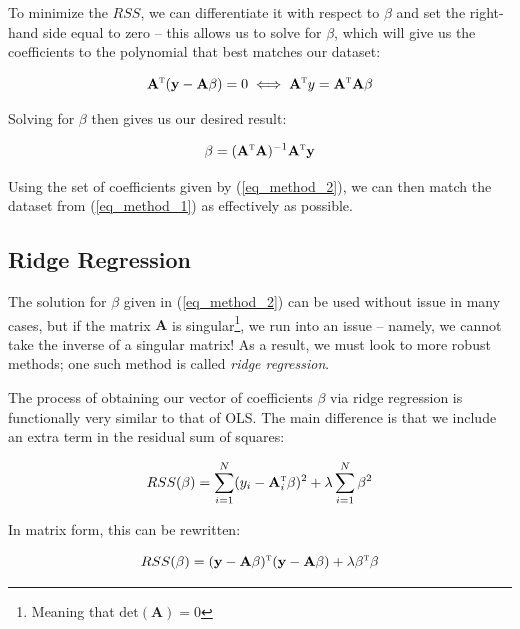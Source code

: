 \documentclass[a4paper,10pt,english]{article}
\begin{document}
	To minimize the $RSS$, we can differentiate it with respect to $\beta$ and set the right-hand side equal to zero – this allows us to solve for $\beta$, which will give us the coefficients to the polynomial that best matches our dataset:
	
	\begin{equation*}
	\mathbf{A}^\textsc{t} (\mathbf{y} - \mathbf{A} \beta) = 0 \iff \mathbf{A}^\textsc{t} y = \mathbf{A}^\textsc{t} \mathbf{A} \beta
	\end{equation*}
	
	Solving for $\beta$ then gives us our desired result:
	
	\begin{equation}
	\label{eq_method_2}
	\beta = (\mathbf{A}^\textsc{t} \mathbf{A} ) ^{-1} \mathbf{A}^\textsc{t} \mathbf{y}
	\end{equation}
	
	Using the set of coefficients given by (\ref{eq_method_2}), we can then match the dataset from (\ref{eq_method_1}) as effectively as possible.
	
	\subsection*{Ridge Regression}
	
	The solution for $\beta$ given in (\ref{eq_method_2}) can be used without issue in many cases, but if the matrix $\mathbf{A}$ is singular\footnote{Meaning that $\text{det}(\mathbf{A}) = 0$}, we run into an issue – namely, we cannot take the inverse of a singular matrix!  As a result, we must look to more robust methods; one such method is called \textit{ridge regression}.  
	
	The process of obtaining our vector of coefficients $\beta$ via ridge regression is functionally very similar to that of OLS.  The main difference is that we include an extra term in the residual sum of squares:

	\begin{equation*}
	RSS(\beta) = \sum_{i=1}^N (y_i - \mathbf{A}_i^\textsc{t} \beta)^2 + \lambda \sum_{i=1}^N \beta^2
	\end{equation*}
	
	In matrix form, this can be rewritten:	
	
	\begin{equation*}
	RSS(\beta) = (\mathbf{y} - \mathbf{A} \beta)^\textsc{t}(\mathbf{y} - \mathbf{A} \beta) + \lambda \beta^\textsc{t} \beta
	\end{equation*}
	
\end{document}
